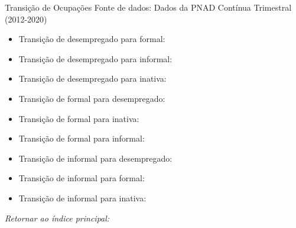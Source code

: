 \begin{frame}[label=_transicao_ocupacao]{Transição de Ocupações}
{\footnotesize Fonte de dados: Dados da PNAD Contínua Trimestral (2012-2020)}
\begin{itemize}
\item{Transição de desempregado para formal: \hyperlink{_transicao_ocupacao_sh_desempregado_sh_formal}{}}
\item{Transição de desempregado para informal: \hyperlink{_transicao_ocupacao_sh_desempregado_sh_informal}{}}
\item{Transição de desempregado para inativa: \hyperlink{_transicao_ocupacao_sh_desempregado_sh_inativa}{}}
\item{Transição de formal para desempregado: \hyperlink{_transicao_ocupacao_sh_formal_sh_desempregado}{}}
\item{Transição de formal para inativa: \hyperlink{_transicao_ocupacao_sh_formal_sh_inativa}{}}
\item{Transição de formal para informal: \hyperlink{_transicao_ocupacao_sh_formal_sh_informal}{}}
\item{Transição de informal para desempregado: \hyperlink{_transicao_ocupacao_sh_informal_sh_desempregado}{}}
\item{Transição de informal para formal: \hyperlink{_transicao_ocupacao_sh_informal_sh_formal}{}}
\item{Transição de informal para inativa: \hyperlink{_transicao_ocupacao_sh_informal_sh_inativa}{}}

\end{itemize}

\begin{small}
\textit{Retornar ao índice principal: \hyperlink{indice_principal}{} }
\end{small}

\end{frame}

